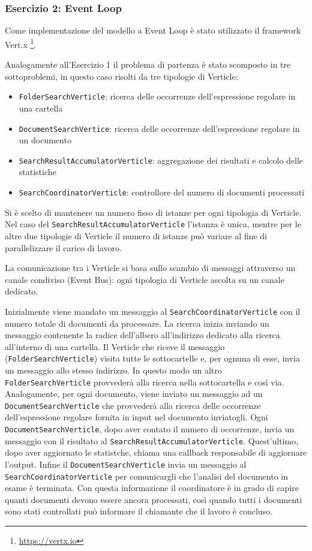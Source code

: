 ﻿\documentclass[a4paper]{article}
\begin{document}
\subsubsection{Esercizio 2: Event Loop}

Come implementazione del modello a Event Loop \`e stato utilizzato il framework Vert.x \footnote{\url{https://vertx.io}}.

Analogamente all'Esercizio 1 il problema di partenza \`e stato scomposto in tre sottoproblemi, in questo caso risolti da tre tipologie di Verticle:

\begin{itemize}
%
    \item \texttt{FolderSearchVerticle}: ricerca delle occorrenze dell'espressione regolare in una cartella
%
    \item \texttt{DocumentSearchVertice}: ricerca delle occorrenze dell'espressione regolare in un documento
%
    \item \texttt{SearchResultAccumulatorVerticle}: aggregazione dei risultati e calcolo delle statistiche
%
    \item \texttt{SearchCoordinatorVerticle}: controllore del numero di documenti processati
%
\end{itemize}

Si \`e scelto di mantenere un numero fisso di istanze per ogni tipologia di Verticle.
%
Nel caso del \texttt{SearchResultAccumulatorVerticle} l'istanza \`e unica, mentre per le altre due tipologie di Verticle il numero di istanze pu\`o variare al fine di parallelizzare il carico di lavoro.

La comunicazione tra i Verticle si basa sullo scambio di messaggi attraverso un canale condiviso (Event Bus): ogni tipologia di Verticle ascolta su un canale dedicato.

Inizialmente viene mandato un messaggio al \texttt{SearchCoordinatorVerticle} con il numero totale di documenti da processare. 
%
La ricerca inizia inviando un messaggio contenente la radice dell'albero all'indirizzo dedicato alla ricerca all'interno di una cartella.
%
Il Verticle che riceve il messaggio (\texttt{FolderSearchVerticle}) visita tutte le sottocartelle e, per ognuna di esse, invia un messaggio allo stesso indirizzo.
%
In questo modo un altro \texttt{FolderSearchVerticle} provveder\`a alla ricerca nella sottocartella e cos\`i via.
%
Analogamente, per ogni documento, viene inviato un messaggio ad un \texttt{DocumentSearchVerticle} che provveder\`a alla ricerca delle occorrenze dell'espressione regolare fornita in input nel documento inviatogli.
%
Ogni \texttt{DocumentSearchVerticle}, dopo aver contato il numero di occorrenze, invia un messaggio con il risultato al \texttt{SearchResultAccumulatorVerticle}. Quest'ultimo, dopo aver aggiornato le statistche, chiama una callback responsabile di aggiornare l'output.
%
Infine il \texttt{DocumentSearchVerticle} invia un messaggio al \texttt{SearchCoordinatorVerticle} per comunicargli che l'analisi del documento in esame è terminata. Con questa informazione il coordinatore è in grado di capire quanti documenti devono essere ancora processati, così quando tutti i documenti sono stati controllati può informare il chiamante che il lavoro è concluso.
%
\end{document}
